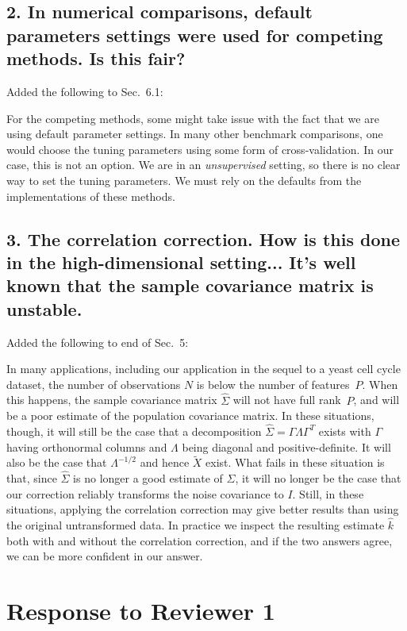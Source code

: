\documentclass[11pt]{article}
\newcommand{\T}{T}
\begin{document}
\subsection{2. In numerical comparisons, default parameters settings were used for
competing methods. Is this fair?}

Added the following to Sec.~6.1:

For the competing methods, some might take issue with the fact that we are
using default parameter settings.  In many other benchmark comparisons, one
would choose the tuning parameters using some form of cross-validation. In our
case, this is not an option. We are in an \emph{unsupervised} setting, so
there is no clear way to set the tuning parameters. We must rely on the
defaults from the implementations of these methods.


\subsection{3. The correlation correction. How is this done in the high-dimensional
setting... It's well known that the sample covariance matrix is unstable.}

Added the following to end of Sec.~5:


In many applications, including our application in the sequel to a yeast cell
cycle dataset, the number of observations $N$ is below the number of
features~$P$. When this happens, the sample covariance matrix $\hat \Sigma$
will not have full rank~$P$, and will be a poor estimate of the population
covariance matrix. In these situations, though, it will still be the case that
a decomposition $\hat \Sigma = \Gamma \Lambda \Gamma^\T$ exists with $\Gamma$
having orthonormal columns and $\Lambda$ being diagonal and positive-definite.
It will also be the case that $\Lambda^{-1/2}$ and hence $\tilde{X}$
exist. What fails in these situation is that, since $\hat \Sigma$ is no longer
a good estimate of $\Sigma$, it will no longer be the case that our correction
reliably transforms the noise covariance to $I$. Still, in these situations,
applying the correlation correction may give better results than using the
original untransformed data. In practice we inspect the resulting estimate
$\hat k$ both with and without the correlation correction, and if the two
answers agree, we can be more confident in our answer.



\section{Response to Reviewer 1}
\end{document}
